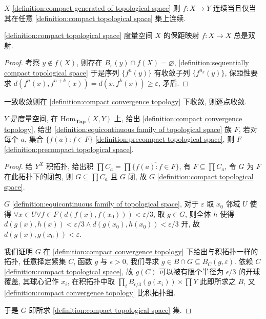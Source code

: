 \begin{lemma}
    \(X\) \ref{definition:compact generated of topological space} 则 \(f : X \to Y\) 连续当且仅当其在任意 \ref{definition:compact topological space} 集上连续.
\end{lemma}

\begin{lemma}
    \ref{definition:compact topological space} 度量空间 \(X\) 的保距映射 \(f : X \to X\) 总是双射.

    \begin{proof}
        考察 \(y \notin f(X)\), 则存在 \(B_{\varepsilon} (y) \cap f(X) = \varnothing\), \ref{definition:sequentially compact topological space} 于是序列 \(\{f^n (y)\}\) 有收敛子列 \(\{f^{n_k} (y)\}\),
        保距性要求 \(d(f^{n}(x),f^{n+k}(x)) = d(x,f^{k}(x)) \geq \varepsilon\), 矛盾.
    \end{proof}
\end{lemma}

\begin{lemma}
    一致收敛则在 \ref{definition:compact convergence topology} 下收敛, 则逐点收敛.
\end{lemma}

\begin{theorem}[Ascoli]
    \(Y\) 是度量空间, 在 \(\mathrm{Hom}_{\mathbf{Top}} (X,Y)\) 上, 给出 \ref{definition:compact convergence topology},
    给出 \ref{definition:equicontinuous family of topological space} 族 \(F\), 若对每个 \(a\), 集合 \(\{f(a) : f \in F\}\) \ref{definition:precompact topological space},
    则 \(F\) \ref{definition:precompact topological space}.

    \begin{proof}
        给 \(Y^X\) 积拓扑, 给出积 \(\prod C_a = \prod \overline{\{f(a):f \in F\}}\), 有 \(F \subseteq \prod C_a\),
        令 \(G\) 为 \(F\) 在此拓扑下的闭包, 则 \(G \subseteq \prod C_a\) 且 \(G\) 闭, 故 \(G\) \ref{definition:compact topological space}.

        \(G\) \ref{definition:equicontinuous family of topological space}, 对于 \(\varepsilon\) 取 \(x_0\) 邻域 \(U\) 使得 \(\forall x \in U \forall f \in F (d(f(x),f(x_0))) < \varepsilon/3\),
        取 \(g \in G\), 则全体 \(h\) 使得 \(d (g(x),h(x)) < \varepsilon/3 \land d (g(x_0),h(x_0)) < \varepsilon/3\) 开, 故 \(d (g(x),g(x_0)) < \varepsilon\).

        我们证明 \(G\) 在 \ref{definition:compact convergence topology} 下给出与积拓扑一样的拓扑, 任意择定紧集 \(C\), 函数 \(g\) 与 \(\epsilon > 0\),
        我们寻求 \(g \in B \cap G \subseteq B_C (g,\varepsilon)\). 依赖 \(C\) \ref{definition:compact topological space}, 故 \(g(C)\) 可以被有限个半径为 \(\epsilon/3\) 的开球覆盖,
        其球心记作 \(x_i\), 在积拓扑中取 \(\prod_i B_{\epsilon/3} (g(x_i)) \times \prod Y\) 此即所求之 \(B\), 又 \ref{definition:compact convergence topology} 比积拓扑细.

        于是 \(G\) 即所求 \ref{definition:compact topological space} 集.
    \end{proof}
\end{theorem}

